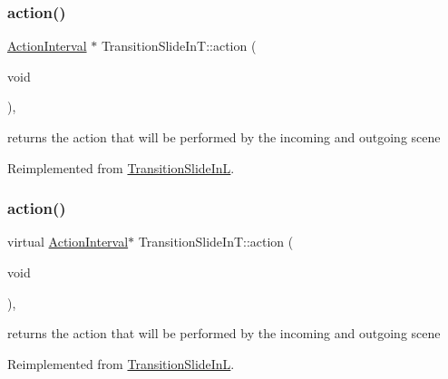 \subsubsection{\texorpdfstring{action()}{action()}\hspace{0.1cm}{\footnotesize\ttfamily [1/2]}}
{\footnotesize\ttfamily \hyperlink{classActionInterval}{Action\+Interval} $\ast$ Transition\+Slide\+In\+T\+::action (\begin{DoxyParamCaption}\item[{void}]{ }\end{DoxyParamCaption})\hspace{0.3cm}{\ttfamily [override]}, {\ttfamily [virtual]}}

returns the action that will be performed by the incoming and outgoing scene 

Reimplemented from \hyperlink{classTransitionSlideInL_a22b0c0b07f15fc0d19fcdf01e4182a3e}{Transition\+Slide\+InL}.

\mbox{\label{classTransitionSlideInT_a47099107f7fdb8ca5f5f16f66a5c6670}} 
\subsubsection{\texorpdfstring{action()}{action()}\hspace{0.1cm}{\footnotesize\ttfamily [2/2]}}
{\footnotesize\ttfamily virtual \hyperlink{classActionInterval}{Action\+Interval}$\ast$ Transition\+Slide\+In\+T\+::action (\begin{DoxyParamCaption}\item[{void}]{ }\end{DoxyParamCaption})\hspace{0.3cm}{\ttfamily [override]}, {\ttfamily [virtual]}}

returns the action that will be performed by the incoming and outgoing scene 

Reimplemented from \hyperlink{classTransitionSlideInL_a22b0c0b07f15fc0d19fcdf01e4182a3e}{Transition\+Slide\+InL}.

\mbox{\label{classTransitionSlideInT_a1ef0e6155f58e017caa700f4ce613010}} 
